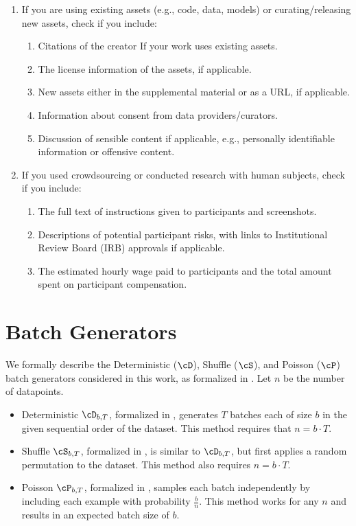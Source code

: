 \documentclass[twoside]{article}
\theoremstyle{definition}
\begin{document}
\begin{enumerate}
\item If you are using existing assets (e.g., code, data, models) or curating/releasing new assets, check if you include:
\begin{enumerate}
\item Citations of the creator If your work uses existing assets. \NA
\item The license information of the assets, if applicable. \NA
\item New assets either in the supplemental material or as a URL, if applicable. \NA
\item Information about consent from data providers/curators. \NA
\item Discussion of sensible content if applicable, e.g., personally identifiable information or offensive content. \NA
\end{enumerate}

\item If you used crowdsourcing or conducted research with human subjects, check if you include:
\begin{enumerate}
\item The full text of instructions given to participants and screenshots. \NA
\item Descriptions of potential participant risks, with links to Institutional Review Board (IRB) approvals if applicable. \NA
\item The estimated hourly wage paid to participants and the total amount spent on participant compensation. \NA
\end{enumerate}
\end{enumerate}

\newpage

\onecolumn
\thispagestyle{plain}\thispagestyle{empty}

\appendix

\section{Batch Generators}\label{app:batch-gen}

We formally describe the Deterministic ($\cD$), Shuffle ($\cS$), and Poisson ($\cP$) batch generators considered in this work, as formalized in \cite{chua24private}. Let $n$ be the number of datapoints.

\begin{itemize}%
	\item Deterministic $\cD_{b, T}$, formalized in , generates $T$ batches each of size $b$ in the given sequential order of the dataset. This method requires that $n = b \cdot T$.
	\item Shuffle $\cS_{b,T}$, formalized in , is similar to $\cD_{b, T}$, but first applies a random permutation to the dataset. This method also requires $n = b \cdot T$.
	\item Poisson $\cP_{b,T}$, formalized in , samples each batch independently by including each example with probability $\frac bn$. This method works for any $n$ and results in an expected batch size of $b$.
\end{itemize}
\end{document}
